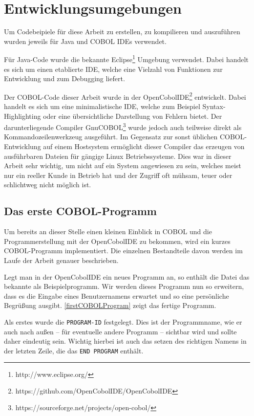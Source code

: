 \section{Entwicklungsumgebungen}
Um Codebeipiele für diese Arbeit zu erstellen, zu kompilieren und auszuführen wurden jeweils für Java und COBOL IDEs verwendet.

Für Java-Code wurde die bekannte Eclipse\footnote{http://www.eclipse.org/} Umgebung verwendet. Dabei handelt es sich um einen etablierte IDE, welche eine Vielzahl von Funktionen zur Entwicklung und zum Debugging liefert.

Der COBOL-Code dieser Arbeit wurde in der OpenCobolIDE\footnote{https://github.com/OpenCobolIDE/OpenCobolIDE} entwickelt. Dabei handelt es sich um eine minimalistische IDE, welche zum Beispiel Syntax-Highlighting oder eine übersichtliche Darstellung von Fehlern bietet. Der darunterliegende Compiler GnuCOBOL\footnote{https://sourceforge.net/projects/open-cobol/} wurde jedoch auch teilweise direkt als Kommandozeilenwerkzeug ausgeführt. Im Gegensatz zur sonst üblichen COBOL-Entwicklung auf einem Hostsystem ermöglicht dieser Compiler das erzeugen von ausführbaren Dateien für gängige Linux Betriebssysteme. Dies war in dieser Arbeit sehr wichtig, um nicht auf ein System angewiesen zu sein, welches meist nur ein reeller Kunde in Betrieb hat und der Zugriff oft mühsam, teuer oder schlichtweg nicht möglich ist.

\subsection*{Das erste COBOL-Programm}

Um bereits an dieser Stelle einen kleinen Einblick in COBOL und die Programmerstellung mit der OpenCobolIDE zu bekommen, wird ein kurzes COBOL-Programm implementiert. Die einzelnen Bestandteile davon werden im Laufe der Arbeit genauer beschrieben.

Legt man in der OpenCobolIDE ein neues Programm an, so enthält die Datei das bekannte  als Beispielprogramm. Wir werden dieses Programm nun so erweitern, dass es die Eingabe eines Benutzernamens erwartet und so eine persönliche Begrüßung ausgibt. \autoref{firstCOBOLProgram} zeigt das fertige Programm.


Als erstes wurde die \texttt{PROGRAM-ID} festgelegt. Dies ist der Programmname, wie er auch nach außen -- für eventuelle andere Programm -- sichtbar wird und sollte daher eindeutig sein. Wichtig hierbei ist auch das setzen des richtigen Namens in der letzten Zeile, die das \texttt{END PROGRAM} enthält.

